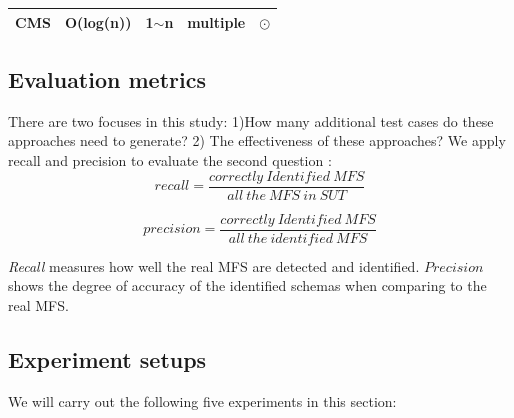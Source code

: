 \documentclass{sig-alternate-05-2015}
\begin{document}
{{{{\begin{table}[htb]
\begin{tabular}{c|c|c|c|c}
      \hline
    CMS & O(log(n)) & 1$\sim$n & multiple   &  $\odot$ \\

  \hline
  \end{tabular}

\end{table}


\subsection{Evaluation metrics}
There are two focuses in this study: 1)How many additional test cases do these approaches need to generate? 2) The effectiveness of these approaches?  We apply recall and precision to evaluate the second question :
$$recall =
 \frac{correctly\ Identified\ MFS}{all\ the\ MFS\ in\ SUT}
$$

$$precision =
 \frac{correctly\ Identified\ MFS}{all\ the\ identified\ MFS}
$$

\emph{Recall} measures how well the real MFS are detected and identified. $Precision$ shows the degree of accuracy of the identified schemas when comparing to the real MFS.

%


\subsection{Experiment setups}
We will carry out the following five experiments in this section:

}}}}
\end{document}

